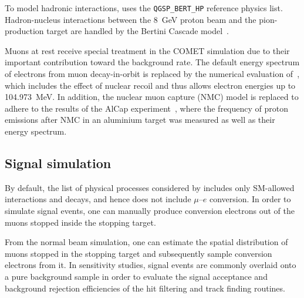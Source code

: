 To model hadronic interactions, \SimG uses the \texttt{QGSP\_BERT\_HP} reference physics list. Hadron-nucleus interactions between the \SI{8}{\GeV} proton beam and the pion-production target are handled by the Bertini Cascade model~\cite{WRIGHT2015175}.

Muons at rest receive special treatment in the COMET simulation due to their important contribution toward the background rate. The default energy spectrum of electrons from muon decay-in-orbit is replaced by the numerical evaluation of~\cite{czarnecki}, which includes the effect of nuclear recoil and thus allows electron energies up to \SI{104.973}{\MeV}. In addition, the nuclear muon capture (NMC) model is replaced to adhere to the results of the AlCap experiment~\cite{litchfield2015status}, where the frequency of proton emissions after NMC in an aluminium target was measured as well as their energy spectrum.


\subsection{Signal simulation}
By default, the list of physical processes considered by \SimG includes only SM-allowed interactions and decays, and hence does not include $\mu$--$e$ conversion. In order to simulate signal events, one can manually produce conversion electrons out of the muons stopped inside the stopping target.

From the normal beam simulation, one can estimate the spatial distribution of muons stopped in the stopping target and subsequently sample conversion electrons from it. In sensitivity studies, signal events are commonly overlaid onto a pure background sample in order to evaluate the signal acceptance and background rejection efficiencies of the hit filtering and track finding routines. %

